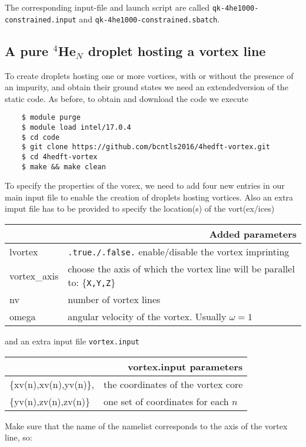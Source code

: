 \documentclass[10pt,a4paper]{article}
\begin{document}
	The corresponding input-file and launch script are called \verb|qk-4he1000-constrained.input| and \verb|qk-4he1000-constrained.sbatch|.
	
	\subsection{A pure $^4$He$_{N}$ droplet hosting a vortex line}
	To create droplets hosting one or more vortices, with or without the presence of an impurity, and obtain their ground states we need an extendedversion of the static code. As before, to obtain and download the code we execute
	\begin{verbatim}
	$ module purge
	$ module load intel/17.0.4
	$ cd code
	$ git clone https://github.com/bcntls2016/4hedft-vortex.git
	$ cd 4hedft-vortex
	$ make && make clean
	\end{verbatim}
	
	To specify the properties of the vorex, we need to add four new entries in our main input file to enable the creation of droplets hosting vortices. Also an extra imput file has to be provided to specify the location(s) of the vort(ex/ices)
	
	\begin{center}
	\begin{tabular}{l|p{9.75cm}}
		\multicolumn{2}{r}{\textbf{Added parameters}} \\
		\hline\hline
		lvortex			&  \verb|.true./.false.| enable/disable the vortex imprinting  \\
		vortex\_axis		&	choose the axis of which the vortex line will be parallel to: \{\verb|X,Y,Z|\} \\
		nv		&	number of vortex lines \\
		omega	&	angular velocity of the vortex. Usually $\omega=1$	
		\end{tabular}
	\end{center}
	\vspace{5px}
	
	and an extra input file \verb|vortex.input|
	
	\begin{center}
		\begin{tabular}{l|p{8.0cm}}
			\multicolumn{2}{r}{\textbf{vortex.input parameters}} \\
			\hline\hline
			\{xv(n),xv(n),yv(n)\},			&  the coordinates of the vortex core  \\
			\{yv(n),zv(n),zv(n)\}		&	one set of coordinates for each $n$ \\
		\end{tabular}
	\end{center}
	\vspace{5px}
	Make sure that the name of the namelist corresponds to the axis of the vortex line, so:
	
\end{document}
